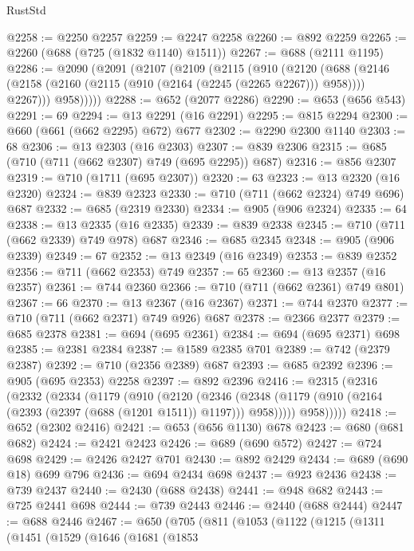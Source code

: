 \begin{lexlean}{RustStd}
\begin{coremodule}
@2258 := @2250 @2257
@2259 := @2247 @2258
@2260 := @892 @2259
@2265 := @2260 (@688 (@725 (@1832 @1140) @1511))
@2267 := @688 (@2111 @1195)
@2286 := @2090
    (@2091
      (@2107
        (@2109
          (@2115
            (@910
              (@2120
                (@688
                  (@2146 (@2158 (@2160 (@2115 (@910 (@2164 (@2245 (@2265 @2267))) @958)))) @2267)))
              @958)))))
@2288 := @652 (@2077 @2286)
@2290 := @653 (@656 @543)
@2291 := 69
@2294 := @13 @2291 (@16 @2291)
@2295 := @815 @2294
@2300 := @660 (@661 (@662 @2295) @672) @677
@2302 := @2290 @2300 @1140
@2303 := 68
@2306 := @13 @2303 (@16 @2303)
@2307 := @839 @2306
@2315 := @685 (@710 (@711 (@662 @2307) @749 (@695 @2295)) @687)
@2316 := @856 @2307
@2319 := @710 (@1711 (@695 @2307))
@2320 := 63
@2323 := @13 @2320 (@16 @2320)
@2324 := @839 @2323
@2330 := @710 (@711 (@662 @2324) @749 @696) @687
@2332 := @685 (@2319 @2330)
@2334 := @905 (@906 @2324)
@2335 := 64
@2338 := @13 @2335 (@16 @2335)
@2339 := @839 @2338
@2345 := @710 (@711 (@662 @2339) @749 @978) @687
@2346 := @685 @2345
@2348 := @905 (@906 @2339)
@2349 := 67
@2352 := @13 @2349 (@16 @2349)
@2353 := @839 @2352
@2356 := @711 (@662 @2353) @749
@2357 := 65
@2360 := @13 @2357 (@16 @2357)
@2361 := @744 @2360
@2366 := @710 (@711 (@662 @2361) @749 @801)
@2367 := 66
@2370 := @13 @2367 (@16 @2367)
@2371 := @744 @2370
@2377 := @710 (@711 (@662 @2371) @749 @926) @687
@2378 := @2366 @2377
@2379 := @685 @2378
@2381 := @694 (@695 @2361)
@2384 := @694 (@695 @2371) @698
@2385 := @2381 @2384
@2387 := @1589 @2385 @701
@2389 := @742 (@2379 @2387)
@2392 := @710 (@2356 @2389) @687
@2393 := @685 @2392
@2396 := @905 (@695 @2353) @2258
@2397 := @892 @2396
@2416 := @2315
    (@2316
      (@2332
        (@2334
          (@1179
            (@910
              (@2120
                (@2346
                  (@2348 (@1179 (@910 (@2164 (@2393 (@2397 (@688 (@1201 @1511)) @1197))) @958)))))
              @958)))))
@2418 := @652 (@2302 @2416)
@2421 := @653 (@656 @1130) @678
@2423 := @680 (@681 @682)
@2424 := @2421 @2423
@2426 := @689 (@690 @572)
@2427 := @724 @698
@2429 := @2426 @2427 @701
@2430 := @892 @2429
@2434 := @689 (@690 @18) @699 @796
@2436 := @694 @2434 @698
@2437 := @923 @2436
@2438 := @739 @2437
@2440 := @2430 (@688 @2438)
@2441 := @948 @682
@2443 := @725 @2441 @698
@2444 := @739 @2443
@2446 := @2440 (@688 @2444)
@2447 := @688 @2446
@2467 := @650
    (@705
      (@811
        (@1053
          (@1122
            (@1215
              (@1311
                (@1451
                  (@1529
                    (@1646
                      (@1681
                        (@1853

\end{coremodule}
\end{lexlean}
